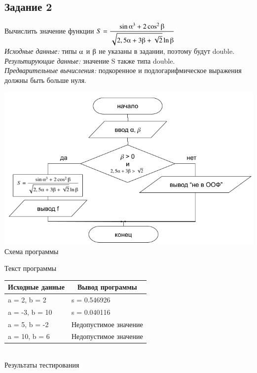 \documentclass[a4paper,14pt]{extarticle}
\begin{document}
\subsection{Задание 2}
Вычислить значение функции
$S = \displaystyle\frac{ \sin \alphaup^3 + 2\cos^2\betaup }{\sqrt{2,5\alphaup + 3\betaup  + \sqrt{2}}\ln \betaup }$\\
\textit{Исходные данные:} типы $\alphaup$ и $\betaup$ не указаны в задании, поэтому будут double.\\
\textit{Результирующие данные:} значение S также типа double.\\
\textit{Предварительные вычисления:} подкоренное и подлогарифмическое выражения должны быть больше нуля.\\
\vspace{0.5cm}
\begin{center}
\includegraphics[scale=0.6]{lab2-2.png}
Схема программы
\end{center}

\begin{center}
Текст программы
\end{center}
\begin{center}
\begin{tabular}{|l|l|}
\hline
\multicolumn{1}{|c|}{Исходные данные}& \multicolumn{1}{|c|}{Вывод программы}\\
\hline
a = 2, b = 2 & s = 0.546926\\
a = -3, b = 10 & s = 0.040116\\
a = 5, b = -2 & Недопустимое значение\\
a = 10, b = 6 & Недопустимое значение\\
\hline
\end{tabular}\\
\vspace{0.3cm}
Результаты тестирования
\end{center}
\end{document}
